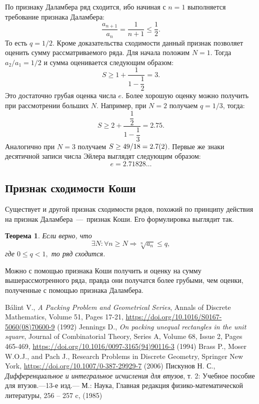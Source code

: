 \documentclass[12pt]{article}
\newtheorem{theorem}{Теорема}[section]
\begin{document}
По признаку Даламбера ряд сходится, ибо начиная с $n=1$ выполняется требование признака Даламбера:
\begin{equation}
    \dfrac{a_{n+1}}{a_n} = \dfrac{1}{n+1} \le \dfrac{1}{2}.
\end{equation}
То есть $q = {1}/{2}$. Кроме доказательства сходимости данный признак позволяет оценить сумму рассматриваемого ряда. Для начала положим $N = 1$. Тогда ${a_2}/{a_1} = {1}/{2}$ и сумма оценивается следующим образом:
\begin{equation}
    S \ge 1 + \dfrac{1}{1-\dfrac{1}{2}} = 3.
\end{equation}
Это достаточно грубая оценка числа $e$. Более хорошую оценку можно получить при рассмотрении больших $N$. Например, при $N = 2$ получаем $q = {1}/{3}$, тогда:
\begin{equation}
    S \ge 2 + \dfrac{\dfrac{1}{2}}{1 - \dfrac{1}{3}} = 2.75.
\end{equation}
Аналогично при $N = 3$ получаем $S \ge {49}/{18} = 2.7\qty(2)$. Первые же знаки десятичной записи числа Эйлера выглядят следующим образом:
\begin{equation}
    e = 2.71828\ldots
\end{equation}
\subsection{Признак сходимости Коши}
Существует и другой признак сходимости рядов, похожий по принципу действия на признак Даламбера~\----~признак Коши. Его формулировка выглядит так.
\begin{theorem}
    Если верно, что
    \begin{equation}
        \exists N:\forall n\ge N \Longrightarrow \sqrt[n]{a_n}\le q,
    \end{equation}
    где $0\le q < 1,$ то ряд сходится.
\end{theorem}
Можно с помощью признака Коши \cite{4} получить и оценку на сумму вышерассмотренного ряда, правда они получатся более грубыми, чем оценки, полученные с помощью признака Даламбера.

\medskip
\begin{thebibliography}{9}
Bálint V., \textit{A Packing Problem and Geometrical Series}, Annals of Discrete Mathematics, Volume 51, Pages 17-21, \url{https://doi.org/10.1016/S0167-5060(08)70600-9} (1992)
Jennings D., \textit{On packing unequal rectangles in the unit square}, Journal of Combinatorial Theory, Series A, Volume 68, Issue 2, Pages 465-469, \url{https://doi.org/10.1016/0097-3165(94)90116-3} (1994)
Brass P., Moser W.O.J., and Pach J., Research Problems in Discrete Geometry, Springer New York, \url{https://doi.org/10.1007/0-387-29929-7} (2006)
Пискунов Н. С., \textit{Дифференциальное и интегральное исчисления для втузов}, т. 2: Учебное пособие для втузов.—13-е изд.— М.: Наука, Главная редакция физико-математической литературы, 256 \--- 257 c, (1985)
\end{thebibliography}
\end{document}

